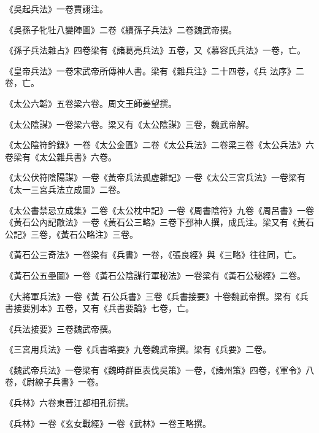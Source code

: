 \begin{pinyinscope}
 《吳起兵法》一卷賈詡注。



 《吳孫子牝牡八變陣圖》二卷《續孫子兵法》二卷魏武帝撰。



 《孫子兵法雜占》四卷梁有《諸葛亮兵法》五卷，又《慕容氏兵法》一卷，亡。



 《皇帝兵法》一卷宋武帝所傳神人書。梁有《雜兵注》二十四卷，《兵
 法序》二卷，亡。



 《太公六韜》五卷梁六卷。周文王師姜望撰。



 《太公陰謀》一卷梁六卷。梁又有《太公陰謀》三卷，魏武帝解。



 《太公陰符鈐錄》一卷《太公金匱》二卷《太公兵法》二卷梁三卷《太公兵法》六卷梁有《太公雜兵書》六卷。



 《太公伏符陰陽謀》一卷《黃帝兵法孤虛雜記》一卷《太公三宮兵法》一卷梁有《太一三宮兵法立成圖》二卷。



 《太公書禁忌立成集》二卷《太公枕中記》一卷《周書陰符》九卷《周呂書》一卷《黃石公內記敵法》一卷《黃石公三略》三卷下邳神人撰，成氏注。梁又有《黃石公記》三卷，《黃石公略注》三卷。



 《黃石公三奇法》一卷梁有《兵書》一卷，《張良經》與《三略》往往同，亡。



 《黃石公五壘圖》一卷《黃石公陰謀行軍秘法》一卷梁有《黃石公秘經》二卷。



 《大將軍兵法》一卷《黃
 石公兵書》三卷《兵書接要》十卷魏武帝撰。梁有《兵書接要別本》五卷，又有《兵書要論》七卷，亡。



 《兵法接要》三卷魏武帝撰。



 《三宮用兵法》一卷《兵書略要》九卷魏武帝撰。梁有《兵要》二卷。



 《魏武帝兵法》一卷梁有《魏時群臣表伐吳策》一卷，《諸州策》四卷，《軍令》八卷，《尉繚子兵書》一卷。



 《兵林》六卷東晉江都相孔衍撰。



 《兵林》一卷《玄女戰經》一卷《武林》一卷王略撰。




\end{pinyinscope}
